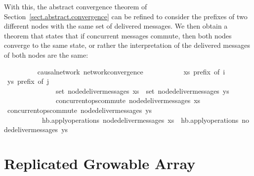 \documentclass[acmlarge,review,anonymous]{acmart}\settopmatter{printfolios=true}
\begin{document}
With this, the abstract convergence theorem of Section~\ref{sect.abstract.convergence} can be refined to consider the prefixes of two different nodes with the same set of delivered messages.
We then obtain a theorem that states that if concurrent messages commute, then both nodes converge to the same state, or rather the interpretation of the delivered messages of both nodes are the same:
\\
\begin{isabellebody}
\ \ \ \ \ \ \ \  {\isacharparenleft}\ causal{\isacharunderscore}network{\isacharparenright}\ network{\isacharunderscore}convergence{\isacharcolon}\isanewline
\ \ \ \ \ \ \ \ \ \ \ {\isachardoublequoteopen}xs\ prefix\ of\ i{\isachardoublequoteclose} \ {\isachardoublequoteopen}ys\ prefix\ of\ j{\isachardoublequoteclose}\isanewline
\ \ \ \ \ \ \ \ \ \ \ \ \ \ \ {\isachardoublequoteopen}set\ {\isacharparenleft}node{\isacharunderscore}deliver{\isacharunderscore}messages\ xs{\isacharparenright}\ {\isacharequal}\ set\ {\isacharparenleft}node{\isacharunderscore}deliver{\isacharunderscore}messages\ ys{\isacharparenright}{\isachardoublequoteclose}\isanewline
\ \ \ \ \ \ \ \ \ \ \ \ \ \ \ {\isachardoublequoteopen}concurrent{\isacharunderscore}ops{\isacharunderscore}commute\ {\isacharparenleft}node{\isacharunderscore}deliver{\isacharunderscore}messages\ xs{\isacharparenright}{\isachardoublequoteclose} \ {\isachardoublequoteopen}concurrent{\isacharunderscore}ops{\isacharunderscore}commute\ {\isacharparenleft}node{\isacharunderscore}deliver{\isacharunderscore}messages\ ys{\isacharparenright}{\isachardoublequoteclose}\isanewline
\ \ \ \ \ \ \ \ \ \ \ {\isachardoublequoteopen}hb.apply{\isacharunderscore}operations\ {\isacharparenleft}node{\isacharunderscore}deliver{\isacharunderscore}messages\ xs{\isacharparenright}\ {\isacharequal}\ hb.apply{\isacharunderscore}operations\ {\isacharparenleft}node{\isacharunderscore}deliver{\isacharunderscore}messages\ ys{\isacharparenright}{\isachardoublequoteclose}
\end{isabellebody}


\section{Replicated Growable Array}
\label{sect.rga}
\end{document}
